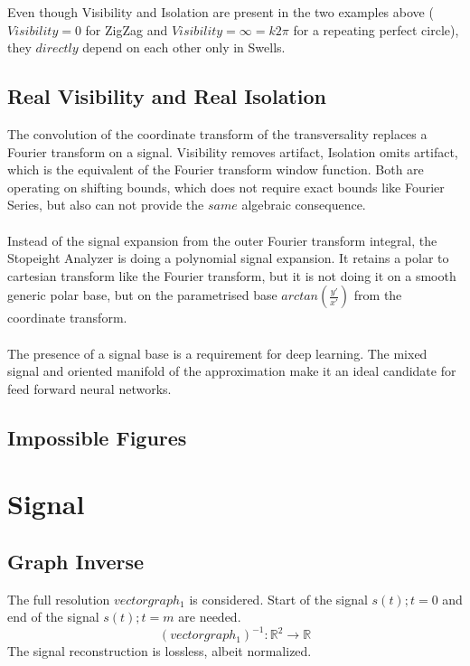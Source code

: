\documentclass{report}
\begin{document}
Even though Visibility and Isolation are present in the two examples above ($Visibility=0$ for ZigZag and $Visibility=\infty=k2\pi$ for a repeating perfect circle), they $directly$ depend on each other only in Swells.

\section{Real Visibility and Real Isolation}

The convolution of the coordinate transform of the transversality replaces a Fourier transform on a signal. Visibility removes artifact, Isolation omits artifact, which is the equivalent of the Fourier transform window function. Both are operating on shifting bounds, which does not require exact bounds like Fourier Series, but also can not provide the $same$ algebraic consequence.\\\\
Instead of the signal expansion from the outer Fourier transform integral, the Stopeight Analyzer is doing a polynomial signal expansion. It retains a polar to cartesian transform like the Fourier transform, but it is not doing it on a smooth generic polar base, but on the parametrised base $arctan(\frac{y'}{x'})$ from the coordinate transform.\\\\
The presence of a signal base is a requirement for deep learning. The mixed signal and oriented manifold of the approximation make it an ideal candidate for feed forward neural networks.

\section{Impossible Figures}

\chapter{Signal}
\section{Graph Inverse}
The full resolution $vectorgraph_{1}$ is considered. Start of the signal $s(t);t=0$ and end of the signal $s(t);t=m$ are needed.
\begin{equation}
(vectorgraph_{1})^{-1}: \mathbb{R}^2 \rightarrow \mathbb{R}
\end{equation}
The signal reconstruction is lossless, albeit normalized.
\end{document}
